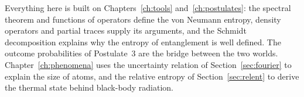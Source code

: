 \begin{whereitsits}
  Everything here is built on Chapters~\ref{ch:tools} and~\ref{ch:postulates}: the spectral theorem and functions of operators define the von Neumann entropy, density operators and partial traces
  supply its arguments, and the Schmidt decomposition explains why the entropy of entanglement is well defined. The outcome probabilities of Postulate~3 are the bridge between the two worlds. Chapter~\ref{ch:phenomena} uses the uncertainty relation of Section~\ref{sec:fourier} to explain the size of atoms, and the relative entropy of Section~\ref{sec:relent} to derive the thermal state behind black-body radiation.
\end{whereitsits}








